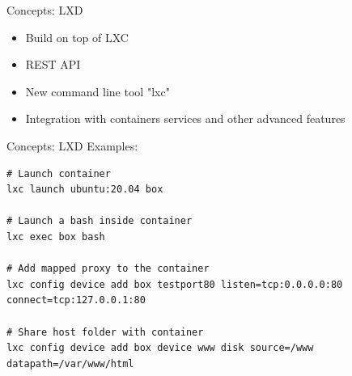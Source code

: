 \documentclass[10pt,english,handout,aspectradio=169]{beamer}
\begin{document}
\begin{frame}{Concepts: LXD}
\begin{itemize}
    \item Build on top of LXC
    \item REST API
    \item New command line tool "lxc"
    \item Integration with containers services and other advanced features
\end{itemize}
    
\end{frame}
\begin{frame}[fragile]{Concepts: LXD}
Examples:
\begin{verbatim}
# Launch container
lxc launch ubuntu:20.04 box

# Launch a bash inside container
lxc exec box bash

# Add mapped proxy to the container
lxc config device add box testport80 listen=tcp:0.0.0.0:80 connect=tcp:127.0.0.1:80

# Share host folder with container
lxc config device add box device www disk source=/www datapath=/var/www/html
\end{verbatim}
    
\end{frame}

\end{document}

